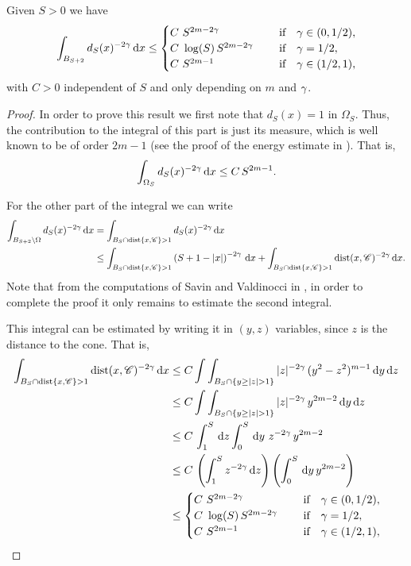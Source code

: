 \begin{lemma}
\label{Lemma: Integrability_dFunction}
Given $S>0$ we have
$$ \int_{B_{S+2}} d_S(x)^{-2\gamma} \,\mathrm{d} x \leq \begin{cases}
C \ S^{2m-2\gamma}\ \ \ \ &\textrm{if } \ \ \gamma\in(0,1/2),\\
C\ \log(S)\,S^{2m-2\gamma}\ \ \ \ &\textrm{if } \ \ \gamma=1/2,\\
C \ S^{2m-1}\ \ \ \ &\textrm{if } \ \ \gamma\in(1/2,1),\\
\end{cases} $$
with $C>0$ independent of $S$ and only depending on $m$ and $\gamma$.
\end{lemma}

\begin{proof}
In order to prove this result we first note that $d_S(x)=1$ in $\Omega_S$. Thus, the contribution to the integral of this part is just its measure, which is well known to be of order $2m-1$ (see the proof of the energy estimate in \cite{CabreTerraI}). That is,
$$\int_{\Omega_S} d_S(x)^{-2\gamma} \,\mathrm{d} x \leq C\,S^{2m-1}.$$

For the other part of the integral we can write
\begin{align*}
\int_{B_{S+2}\setminus \Omega} d_S(x)^{-2\gamma} \,\mathrm{d} x &= \int_{B_{S}\cap \operatorname{dist}\{x,\mathscr{C}\}>1} d_S(x)^{-2\gamma} \,\mathrm{d} x \\
& \leq \int_{B_{S}\cap \operatorname{dist}\{x,\mathscr{C}\}>1} \left( S+1-|x| \right)^{-2\gamma} \,\mathrm{d} x + \int_{B_{S}\cap \operatorname{dist}\{x,\mathscr{C}\}>1} \operatorname{dist}(x,\mathscr{C})^{-2\gamma} \,\mathrm{d} x.
\end{align*}
Note that from the computations of Savin and Valdinocci in \cite{SavinValdinoci-EnergyEstimate}, in order to complete the proof it only remains to estimate the second integral.

This integral can be estimated by writing it in $(y,z)$ variables, since $z$ is the distance to the cone. That is,
\begin{align*}
\int_{B_{S}\cap \dist\{x,\ccal\}>1} \dist(x,\ccal)^{-2\s} \d x &\leq C \int \int_{B_{S}\cap \{y\geq|z|>1\}} |z|^{-2\s} \, (y^2-z^2)^{m-1} \d y\d z \\
& \leq C \int \int_{B_{S}\cap \{y\geq|z|>1\}} |z|^{-2\s} \, y^{2m-2} \d y\d z \\
& \leq C\, \int_1^S \d z \int_0^S \d y\ z^{-2\s} \, y^{2m-2} \\
& \leq C\, \left(\int_1^S z^{-2\s} \d z \right)  \left(  \int_0^S \d y \, y^{2m-2} \right) \\
& \leq \begin{cases}
C \ S^{2m-2\s}\ \ \ \ &\textrm{if } \ \ \s\in(0,1/2),\\
C\ \log(S)\,S^{2m-2\s}\ \ \ \ &\textrm{if } \ \ \s=1/2,\\
C \ S^{2m-1}\ \ \ \ &\textrm{if } \ \ \s\in(1/2,1),\\
\end{cases}
\end{align*}
\end{proof}

